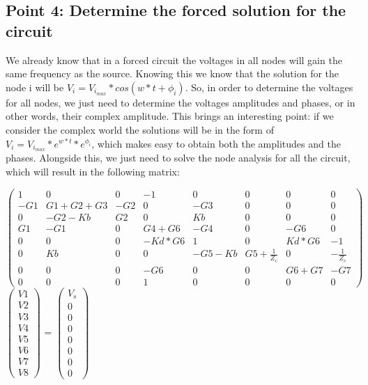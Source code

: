\subsection{Point 4: Determine the forced solution for the circuit}

We already know that in a forced circuit the voltages in all nodes will gain the same frequency as the source. Knowing this we know that the solution for the node i will be $V_{i} = V_{i_{max}}*cos(w*t + \phi_{i})$. So, in order to determine the voltages for all nodes, we just need to determine the voltages amplitudes and phases, or in other words, their complex amplitude. This brings an interesting point: if we consider the complex world the solutions will be in the form of $V_{i} = V_{i_{max}}*e^{w*t} * e^{\phi_{i}}$, which makes easy to obtain both the amplitudes and the phases.
Alongside this, we just need to solve the node analysis for all the circuit, which will result in the following matrix:

$\begin{pmatrix}
1 & 0 & 0 & -1 & 0 & 0 & 0 & 0\\
-G1 & G1+G2+G3 & -G2 & 0 & -G3 & 0 & 0 & 0\\
0 & -G2-Kb & G2 & 0 & Kb & 0 & 0 & 0 \\
G1 & -G1 & 0 & G4+G6 & -G4 & 0 & -G6 & 0\\
0 & 0 & 0 & -Kd*G6 & 1 & 0 & Kd*G6 & -1 \\
0 & Kb & 0 & 0 & -G5-Kb & G5+\frac{1}{Z_c} & 0 & -\frac{1}{Z_c} \\
0 & 0 & 0 & -G6 & 0 & 0 & G6+G7 & -G7  \\ 
0 & 0 & 0 & 1 & 0 & 0 & 0 & 0
\end{pmatrix}$
$\begin{pmatrix}
V1\\
V2\\
V3\\
V4\\
V5\\
V6\\
V7\\
V8
\end{pmatrix}$
=
$\begin{pmatrix}
V_s\\
0\\
0\\
0\\
0\\
0\\
0\\
0
\end{pmatrix}$


